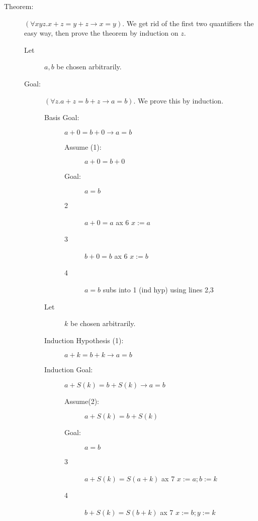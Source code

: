 \documentclass[12pt]{article}
\begin{document}
\begin{description}

\item[Theorem:]  $(\forall xyz.x+z=y+z \rightarrow x=y)$.  We get rid of the first two quantifiers the easy way, then prove the theorem by induction on $z$.

\begin{description}

\item[Let]  $a,b$ be chosen arbitrarily.

\item[Goal:]  $(\forall z.a+z=b+z \rightarrow a=b)$.  We prove this by induction.

\begin{description}

\item[Basis Goal:]  $a+0=b+0 \rightarrow a=b$

\begin{description}

\item[Assume (1):]  $a+0=b+0$

\item[Goal:]  $a=b$

\item[2]  $a+0=a$  ax 6 $x:=a$

\item[3]  $b+0=b$  ax 6 $x:=b$

\item[4]  $a=b$  subs into 1 (ind hyp) using lines 2,3

\end{description}

\item[Let]  $k$ be chosen arbitrarily.

\item[Induction Hypothesis (1):]  $a+k=b+k \rightarrow a=b$

\item[Induction Goal:]  $a+S(k)=b+S(k) \rightarrow a=b$

\begin{description}

\item[Assume(2):]  $a+S(k)=b+S(k)$

\item[Goal:]  $a=b$

\item[3]  $a+S(k) = S(a+k)$  ax 7 $x:=a; b:=k$

\item[4]  $b+S(k) = S(b+k)$  ax 7 $x:=b; y:=k$


\end{description}
\end{description}
\end{description}
\end{description}
\end{document}
